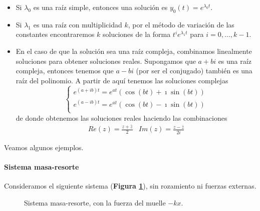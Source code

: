 \begin{itemize}
\item Si $λ_0$ es una raíz simple, entonces una solución es $y_0(t) = e^{λ_0t}$.
\item Si $λ_1$ es una raíz con multiplicidad $k$, por el método de variación de las constantes encontraremos $k$ soluciones de la forma $t^ie^{λ_1t}$ para $i=0,\hdots,k-1$.
\item En el caso de que la solución sea una raíz compleja, combinamos linealmente soluciones para obtener soluciones reales.
Supongamos que $a+bi$ es una raíz compleja, entonces tenemos que $a-bi$ (por ser el conjugado) también es una raíz del polinomio. A partir de aquí tenemos las soluciones complejas \begin{equation}
\left\lbrace \begin{array}{l}
e^{(a+ib)t} = e^{at}(\cos(bt)+\imath\sin(bt))\\
e^{(a-ib)t} = e^{at}(\cos(bt)-\imath\sin(bt))\\
\end{array}\right.
\end{equation}
de donde obtenemos las soluciones reales haciendo las combinaciones
$$\begin{array}{c|c}
Re(z) = \frac{z+\bar{z}}{2} & Im(z) = \frac{z-\bar{z}}{2i}
\end{array}$$
\end{itemize}

Veamos algunos ejemplos.

\paragraph{Sistema masa-resorte}

Consideramos el siguiente sistema (\textbf{Figura \ref{imgMasaResorte1}}), sin rozamiento ni fuerzas externas.

\begin{figure}[hbtp]
\centering
{}
\caption{Sistema masa-resorte, con la fuerza del muelle $-kx$.}
\label{imgMasaResorte1}
\end{figure}

